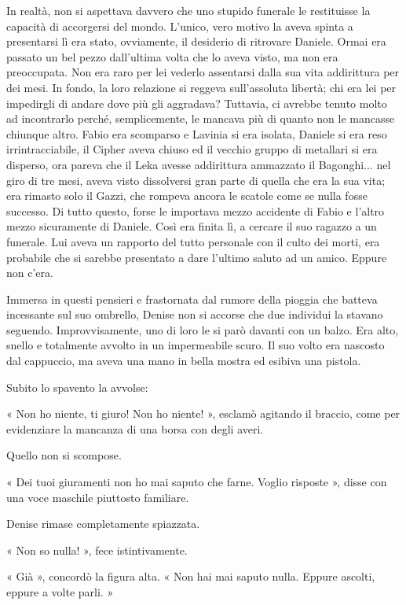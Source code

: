In realtà, non si aspettava davvero che uno stupido funerale le restituisse la capacità di accorgersi del mondo. L'unico, vero motivo la aveva spinta a presentarsi lì era stato, ovviamente, il desiderio di ritrovare Daniele. Ormai era passato un bel pezzo dall'ultima volta che lo aveva visto, ma non era preoccupata. Non era raro per lei vederlo assentarsi dalla sua vita addirittura per dei mesi. In fondo, la loro relazione si reggeva sull'assoluta libertà; chi era lei per impedirgli di andare dove più gli aggradava? Tuttavia, ci avrebbe tenuto molto ad incontrarlo perché, semplicemente, le mancava più di quanto non le mancasse chiunque altro. Fabio era scomparso e Lavinia si era isolata, Daniele si era reso irrintracciabile, il Cipher aveva chiuso ed il vecchio gruppo di metallari si era disperso, ora pareva che il Leka avesse addirittura ammazzato il Bagonghi... nel giro di tre mesi, aveva visto dissolversi gran parte di quella che era la sua vita; era rimasto solo il Gazzi, che rompeva ancora le scatole come se nulla fosse successo. Di tutto questo, forse le importava mezzo accidente di Fabio e l'altro mezzo sicuramente di Daniele. Così era finita lì, a cercare il suo ragazzo a un funerale. Lui aveva un rapporto del tutto personale con il culto dei morti, era probabile che si sarebbe presentato a dare l'ultimo saluto ad un amico. Eppure non c'era.

Immersa in questi pensieri e frastornata dal rumore della pioggia che batteva incessante sul suo ombrello, Denise non si accorse che due individui la stavano seguendo. Improvvisamente, uno di loro le si parò davanti con un balzo. Era alto, snello e totalmente avvolto in un impermeabile scuro. Il suo volto era nascosto dal cappuccio, ma aveva una mano in bella mostra ed esibiva una pistola.

Subito lo spavento la avvolse:

« Non ho niente, ti giuro! Non ho niente! », esclamò agitando il braccio, come per evidenziare la mancanza di una borsa con degli averi.

Quello non si scompose.

« Dei tuoi giuramenti non ho mai saputo che farne. Voglio risposte », disse con una voce maschile piuttosto familiare.

Denise rimase completamente spiazzata.

« Non so nulla! », fece istintivamente.

« Già », concordò la figura alta. « Non hai mai saputo nulla. Eppure ascolti, eppure a volte parli. »

